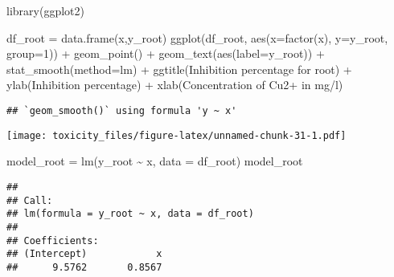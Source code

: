 \documentclass[
]{article}
\newenvironment{Shaded}{\begin{snugshade}}{\end{snugshade}}
\newcommand{\AttributeTok}[1]{\textcolor[rgb]{0.77,0.63,0.00}{#1}}
\newcommand{\DecValTok}[1]{\textcolor[rgb]{0.00,0.00,0.81}{#1}}
\newcommand{\FunctionTok}[1]{\textcolor[rgb]{0.00,0.00,0.00}{#1}}
\newcommand{\NormalTok}[1]{#1}
\newcommand{\OtherTok}[1]{\textcolor[rgb]{0.56,0.35,0.01}{#1}}
\newcommand{\SpecialCharTok}[1]{\textcolor[rgb]{0.00,0.00,0.00}{#1}}
\newcommand{\StringTok}[1]{\textcolor[rgb]{0.31,0.60,0.02}{#1}}
\begin{document}
\begin{Shaded}
\begin{Highlighting}[]
\FunctionTok{library}\NormalTok{(ggplot2)}
\end{Highlighting}
\end{Shaded}

\begin{Shaded}
\begin{Highlighting}[]
\NormalTok{df\_root }\OtherTok{=} \FunctionTok{data.frame}\NormalTok{(x,y\_root)}
\FunctionTok{ggplot}\NormalTok{(df\_root, }\FunctionTok{aes}\NormalTok{(}\AttributeTok{x=}\FunctionTok{factor}\NormalTok{(x), }\AttributeTok{y=}\NormalTok{y\_root, }\AttributeTok{group=}\DecValTok{1}\NormalTok{)) }\SpecialCharTok{+} \FunctionTok{geom\_point}\NormalTok{() }\SpecialCharTok{+} \FunctionTok{geom\_text}\NormalTok{(}\FunctionTok{aes}\NormalTok{(}\AttributeTok{label=}\NormalTok{y\_root)) }\SpecialCharTok{+} \FunctionTok{stat\_smooth}\NormalTok{(}\AttributeTok{method=}\StringTok{\textquotesingle{}lm\textquotesingle{}}\NormalTok{) }\SpecialCharTok{+} \FunctionTok{ggtitle}\NormalTok{(}\StringTok{\textquotesingle{}Inhibition percentage for root\textquotesingle{}}\NormalTok{) }\SpecialCharTok{+} \FunctionTok{ylab}\NormalTok{(}\StringTok{\textquotesingle{}Inhibition percentage\textquotesingle{}}\NormalTok{) }\SpecialCharTok{+} \FunctionTok{xlab}\NormalTok{(}\StringTok{\textquotesingle{}Concentration of Cu2+ in mg/l\textquotesingle{}}\NormalTok{)}
\end{Highlighting}
\end{Shaded}

\begin{verbatim}
## `geom_smooth()` using formula 'y ~ x'
\end{verbatim}

\texttt{[image: toxicity\_files/figure-latex/unnamed-chunk-31-1.pdf]}

\begin{Shaded}
\begin{Highlighting}[]
\NormalTok{model\_root }\OtherTok{=} \FunctionTok{lm}\NormalTok{(y\_root }\SpecialCharTok{\textasciitilde{}}\NormalTok{ x, }\AttributeTok{data =}\NormalTok{ df\_root)}
\NormalTok{model\_root}
\end{Highlighting}
\end{Shaded}

\begin{verbatim}
## 
## Call:
## lm(formula = y_root ~ x, data = df_root)
## 
## Coefficients:
## (Intercept)            x  
##      9.5762       0.8567
\end{verbatim}
\end{document}
